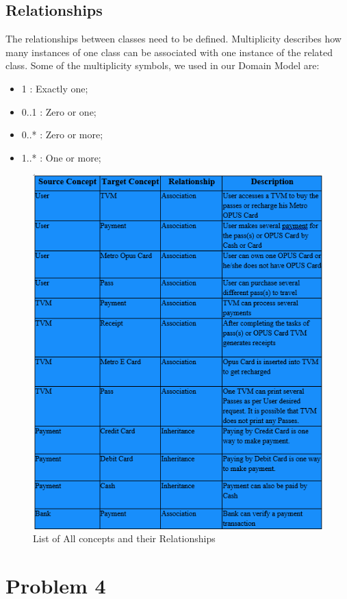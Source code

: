 \documentclass[11pt,oneside]{book}
\begin{document}
\section{Relationships}
The relationships between classes need to be defined. Multiplicity describes how many     instances of one class can be associated with one instance of the related class. 
Some of the multiplicity symbols, we used in our Domain Model are: 
\begin{itemize}
\item   1  :  Exactly one;
\item   0..1  :  Zero or one; 
\item 0..*  :  Zero or more; 
\item 1..*  :  One or more; 

\end{itemize}

\begin{figure}[htp]
\includegraphics[width = 12cm]{images/table2.PNG} 
    \centering
     \caption{List of All concepts and their Relationships}
\end{figure}


\chapter{Problem 4}
\end{document}
